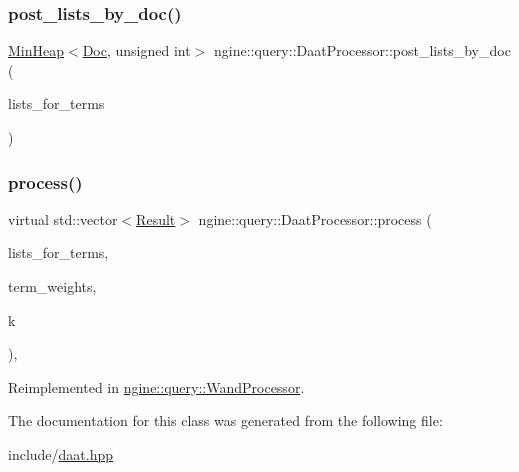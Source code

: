 \subsubsection{\texorpdfstring{post\+\_\+lists\+\_\+by\+\_\+doc()}{post\_lists\_by\_doc()}}
{\footnotesize\ttfamily \hyperlink{classngine_1_1MinHeap}{Min\+Heap}$<$\hyperlink{structngine_1_1Doc}{Doc}, unsigned int$>$ ngine\+::query\+::\+Daat\+Processor\+::post\+\_\+lists\+\_\+by\+\_\+doc (\begin{DoxyParamCaption}\item[{const std\+::vector$<$ \hyperlink{classngine_1_1PostingList}{Posting\+List} $>$ \&}]{lists\+\_\+for\+\_\+terms }\end{DoxyParamCaption})\hspace{0.3cm}{\ttfamily [inline]}}

\mbox{\label{classngine_1_1query_1_1DaatProcessor_a5d5eee5d923afd4929f05f7f38d25bfb}} 
\subsubsection{\texorpdfstring{process()}{process()}}
{\footnotesize\ttfamily virtual std\+::vector$<$\hyperlink{structngine_1_1query_1_1Result}{Result}$>$ ngine\+::query\+::\+Daat\+Processor\+::process (\begin{DoxyParamCaption}\item[{std\+::vector$<$ \hyperlink{classngine_1_1PostingList}{Posting\+List} $>$ \&}]{lists\+\_\+for\+\_\+terms,  }\item[{const std\+::vector$<$ \hyperlink{structngine_1_1Score}{Score} $>$ \&}]{term\+\_\+weights,  }\item[{std\+::size\+\_\+t}]{k }\end{DoxyParamCaption})\hspace{0.3cm}{\ttfamily [inline]}, {\ttfamily [virtual]}}



Reimplemented in \hyperlink{classngine_1_1query_1_1WandProcessor_a7e25bc04d4e2efeab18944fd52a39a38}{ngine\+::query\+::\+Wand\+Processor}.



The documentation for this class was generated from the following file\+:\begin{DoxyCompactItemize}
\item 
include/\hyperlink{daat_8hpp}{daat.\+hpp}\end{DoxyCompactItemize}
